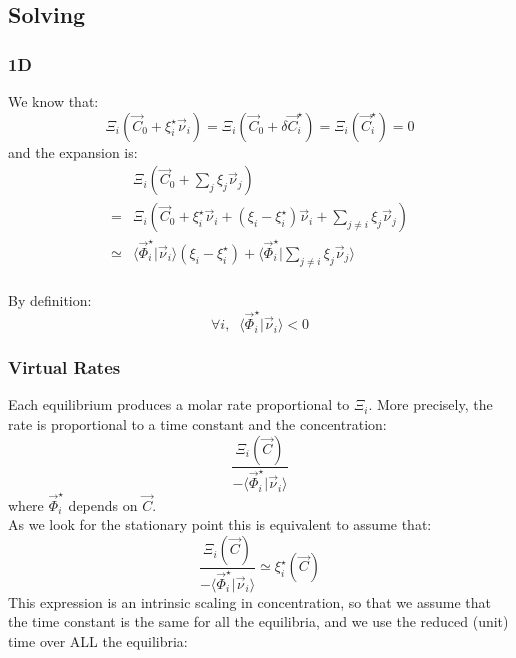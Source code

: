 \documentclass[aps,12pt]{revtex4}
\begin{document}
 
 	
\subsection{Solving}
\subsubsection{1D}
We know that:
\begin{equation}
	\Xi_i(\vec C_0 + \xi_i^\star \vec \nu _i) = \Xi_i(\vec C_0 + \delta \vec C_i^\star) = \Xi_i(\vec C_i^\star) = 0
\end{equation}
and the expansion is:
\begin{equation}
\begin{array}{rl}
	& \Xi_i(\vec C_0 + \sum_j \xi_j \vec \nu_j)\\
=  &\Xi_i(\vec C_0 +  \xi_i^\star \vec \nu _i +  (\xi_i-\xi_i^\star) \vec \nu_i + \sum_{j\not=i} \xi_j \vec \nu_j)\\
\simeq & \langle \vec\Phi_i^\star \vert \vec\nu_i\rangle (\xi_i-\xi_i^\star) +  \langle \vec\Phi_i^\star \vert \sum_{j\not=i} \xi_j \vec \nu_j \rangle \\
\end{array}
\end{equation}
  	
By definition:
\begin{equation}
	\forall i, \;\; \langle \vec\Phi_i^\star \vert \vec\nu_i\rangle < 0
\end{equation}	
	
\subsubsection{Virtual Rates}	

Each equilibrium produces a molar rate proportional to $\Xi_i$. More precisely, the rate is proportional to a time constant
and the concentration:
\begin{equation}
	\dfrac{\Xi_i(\vec C)}{ - \langle \vec\Phi_i^\star \vert \vec\nu_i\rangle }
\end{equation}
where $\vec\Phi_i^\star$ depends on $\vec C$.\\
As we look for the stationary point this is equivalent to assume that:
\begin{equation}
	\dfrac{\Xi_i(\vec C)}{ - \langle \vec\Phi_i^\star \vert \vec\nu_i\rangle } \simeq \xi_i^\star(\vec C)
\end{equation}
This expression is an intrinsic scaling in concentration, so that we assume that the time constant is  the same for
all the equilibria, and we use the reduced (unit) time over ALL the equilibria:
\end{document}
